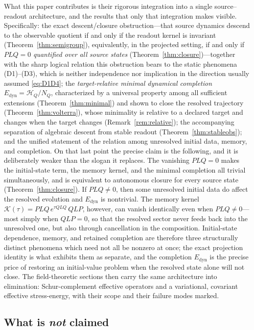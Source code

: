 \documentclass[11pt,reqno]{amsart}
\numberwithin{equation}{section}
\theoremstyle{plain}
\theoremstyle{definition}
\theoremstyle{remark}
\newcommand{\HQ}{\mathcal{H}_{Q}}
\newcommand{\Edyn}{E_{\mathrm{dyn}}}
\newcommand{\Kmem}{\mathcal{K}}
\begin{document}
What this paper contributes is their rigorous integration into a single source--readout
architecture, and the results that only that integration makes visible. Specifically: the exact
descent/closure obstruction---that source dynamics descend to the observable quotient if and only
if the readout kernel is invariant (Theorem~\ref{thm:semigroup}), equivalently, in the projected
setting, if and only if $PLQ=0$ \emph{quantified over all source states}
(Theorem~\ref{thm:closure})---together with the sharp logical relation this obstruction bears to
the static phenomena (D1)--(D3), which is neither independence nor implication in the direction
usually assumed \eqref{eq:D1D4}; the \emph{target-relative minimal dynamical completion}
$\Edyn=\HQ/N_{Q}$, characterized by a universal property among all sufficient extensions
(Theorem~\ref{thm:minimal}) and shown to close the resolved trajectory
(Theorem~\ref{thm:volterra}), whose minimality is relative to a declared target and changes when
the target changes (Remark~\ref{rem:relative}); the accompanying separation of algebraic descent
from stable readout (Theorem~\ref{thm:stableobs}); and the unified statement of the relation
among unresolved initial data, memory, and completion. On that last point the precise claim is
the following, and it is deliberately weaker than the slogan it replaces. The vanishing
$PLQ=0$ makes the initial-state term, the memory kernel, and the minimal completion all
trivial simultaneously, and is equivalent to autonomous closure for every source state
(Theorem~\ref{thm:closure}). If $PLQ\neq0$, then some unresolved initial data do affect the
resolved evolution and $\Edyn$ is nontrivial. The memory kernel
$\Kmem(\tau)=PLQ\,e^{\tau QLQ}\,QLP$, however, can vanish identically even when
$PLQ\neq0$---most simply when $QLP=0$, so that the resolved sector never feeds back into the
unresolved one, but also through cancellation in the composition. Initial-state dependence,
memory, and retained completion are therefore three structurally distinct phenomena which need
not all be nonzero at once; the exact projection identity is what exhibits them as separate,
and the completion $\Edyn$ is the precise price of restoring an initial-value problem when the
resolved state alone will not close. The field-theoretic sections then carry the same architecture into
elimination: Schur-complement effective operators and a variational, covariant effective
stress-energy, with their scope and their failure modes marked.

\subsection{What is \emph{not} claimed}
\end{document}
